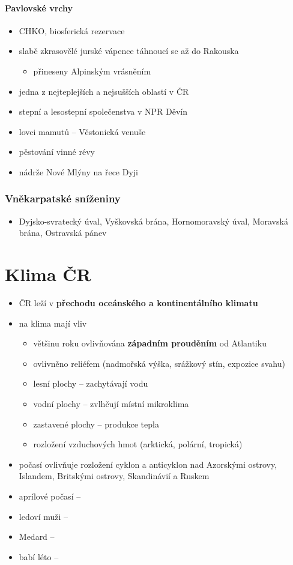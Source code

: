 \paragraph{Pavlovské vrchy}
\begin{itemize}
\item CHKO, biosferická rezervace
\item slabě zkrasovělé jurské vápence táhnoucí se až do Rakouska
	\begin{itemize}
	\item přineseny Alpinským vrásněním
	\end{itemize}
\item jedna z nejteplejších a nejsušších oblastí v ČR
\item stepní a lesostepní společenstva v NPR Děvín
\item lovci mamutů -- Věstonická venuše
\item pěstování vinné révy
\item nádrže Nové Mlýny na řece Dyji
\end{itemize}

\subsubsection{Vněkarpatské sníženiny}
\begin{itemize}
\item Dyjsko-svratecký úval, Vyškovská brána, Hornomoravský úval, Moravská brána, Ostravská pánev
\end{itemize}




\section{Klima ČR}
\begin{itemize}
\item ČR leží v \textbf{přechodu oceánského a kontinentálního klimatu}
\item na klima mají vliv
	\begin{itemize}
	\item většinu roku ovlivňována \textbf{západním prouděním} od Atlantiku
	\item ovlivněno reliéfem (nadmořská výška, srážkový stín, expozice svahu)
	\item lesní plochy -- zachytávají vodu 
	\item vodní plochy -- zvlhčují místní mikroklima
	\item zastavené plochy -- produkce tepla
	\item rozložení vzduchových hmot (arktická, polární, tropická)
	\end{itemize}
\item počasí ovlivňuje rozložení cyklon a anticyklon nad Azorskými ostrovy, Islandem, Britskými ostrovy, Skandinávií a Ruskem
\item aprílové počasí --
\item ledoví muži -- 
\item Medard -- 
\item babí léto --
\end{itemize}

